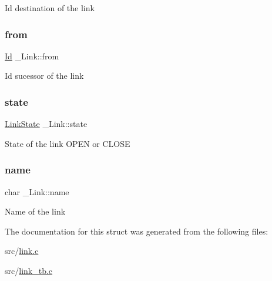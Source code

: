 Id destination of the link \mbox{\label{struct__Link_ae33a61999d11b202a1e1af285aaa84b0}} 
\subsubsection{\texorpdfstring{from}{from}}
{\footnotesize\ttfamily \hyperlink{types_8h_a845e604fb28f7e3d97549da3448149d3}{Id} \+\_\+\+Link\+::from}

Id sucessor of the link \mbox{\label{struct__Link_a58ecee77b2af4dddadb7e8ff94fa0d15}} 
\subsubsection{\texorpdfstring{state}{state}}
{\footnotesize\ttfamily \hyperlink{link_8h_ab0033b911037fd995258d117e65461e0}{Link\+State} \+\_\+\+Link\+::state}

State of the link O\+P\+EN or C\+L\+O\+SE \mbox{\label{struct__Link_aab04e4911b02438ad3e38dc142216935}} 
\subsubsection{\texorpdfstring{name}{name}}
{\footnotesize\ttfamily char \+\_\+\+Link\+::name}

Name of the link 

The documentation for this struct was generated from the following files\+:\begin{DoxyCompactItemize}
\item 
src/\hyperlink{link_8c}{link.\+c}\item 
src/\hyperlink{link__tb_8c}{link\+\_\+tb.\+c}\end{DoxyCompactItemize}
